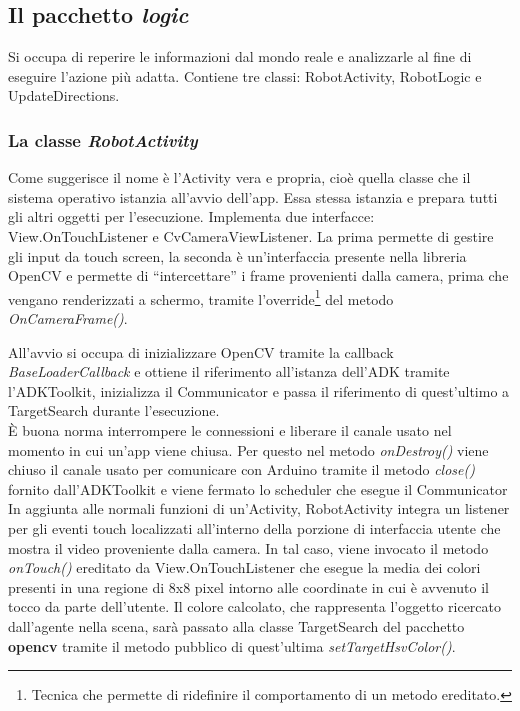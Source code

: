 \subsection {Il pacchetto \textit{logic}}
Si occupa di reperire le informazioni dal mondo reale e analizzarle al fine di
eseguire l'azione più adatta.
Contiene tre classi: RobotActivity, RobotLogic e UpdateDirections.

\subsubsection{La classe \emph{RobotActivity}}
Come suggerisce il nome è l'Activity vera e propria, cioè quella classe che il 
sistema operativo istanzia all'avvio dell'app. Essa stessa istanzia e prepara tutti gli 
altri oggetti per l'esecuzione. Implementa due interfacce: View.OnTouchListener 
e CvCameraViewListener. 
La prima permette di gestire gli input da touch screen,
la seconda è un'interfaccia presente nella libreria OpenCV e permette di ``intercettare''
i frame provenienti dalla camera, prima che vengano renderizzati a schermo, tramite 
l'override\footnote{Tecnica che permette di ridefinire il comportamento di un metodo 
ereditato.} del metodo \textit{OnCameraFrame()}.

All'avvio si occupa di inizializzare OpenCV tramite la 
callback \textit{BaseLoaderCallback} e ottiene il riferimento all'istanza dell'ADK
tramite l'ADKToolkit, inizializza il Communicator e passa il riferimento di quest'ultimo
a TargetSearch durante l'esecuzione.
\\È buona norma interrompere le connessioni e liberare il canale usato 
nel momento in cui un'app viene chiusa. Per questo nel metodo \emph{onDestroy()} 
viene chiuso il canale usato per comunicare con Arduino tramite il metodo \emph{close()}
fornito dall'ADKToolkit e viene fermato lo scheduler che esegue il Communicator\\
In aggiunta alle normali funzioni di un'Activity, RobotActivity integra un 
listener per gli eventi touch localizzati all'interno della porzione di 
interfaccia utente che mostra il video proveniente dalla camera. In tal caso, 
viene invocato il metodo \emph{onTouch()} ereditato da View.OnTouchListener 
che esegue la media dei colori presenti in una regione di 8x8 pixel intorno alle coordinate
in cui è avvenuto il tocco da parte dell'utente. Il colore calcolato, 
che rappresenta l'oggetto ricercato dall'agente nella scena, sarà passato 
alla classe TargetSearch del pacchetto \textbf{opencv} tramite il metodo pubblico 
di quest'ultima \emph{setTargetHsvColor()}.

